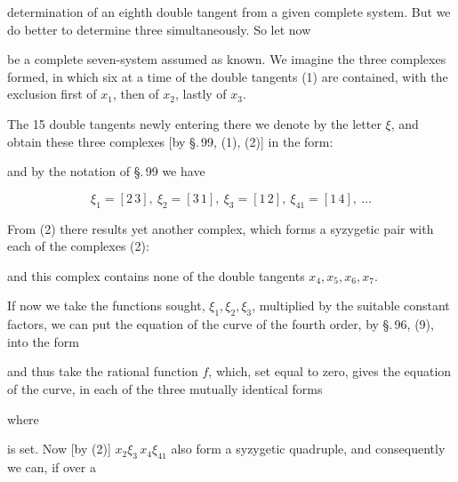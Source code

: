 determination of an eighth double tangent from a given complete system. But we do better to determine three simultaneously. So let now


be a complete seven-system assumed as known. We imagine the three  complexes formed, in which six at a time of the double tangents (1) are contained, with the exclusion first of $x_1$, then of $x_2$, lastly of $x_3$.

The 15 double tangents newly entering there we denote by the letter $\xi$, and obtain these three complexes [by \S.\,99, (1), (2)] in the form:


and by the notation of \S.\,99 we have

\[
\xi_1 = [2\,3],\ \xi_2 = [3\,1],\ \xi_3 = [1\,2],\ \xi_{41} = [1\,4],\ \ldots
\]

From (2) there results yet another  complex, which forms a syzygetic pair with each of the complexes (2):


and this complex contains none of the double tangents $x_4, x_5, x_6, x_7$.

If now we take the functions sought, $\xi_1, \xi_2, \xi_3$, multiplied by the suitable constant factors, we can put the equation of the curve of the fourth order, by \S.\,96, (9), into the form


and thus take the rational function $f$, which, set equal to zero, gives the equation of the curve, in each of the three mutually identical forms


where


is set. Now [by (2)] $x_2\xi_3\, x_4\xi_{41}$ also form a syzygetic quadruple, and consequently we can, if over a
